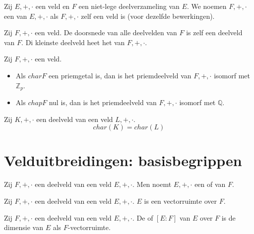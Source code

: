 \documentclass[main.tex]{subfiles}
\begin{document}
\begin{de}
  Zij $E,+,\cdot$ een veld en $F$ een niet-lege deelverzameling van $E$.
  We noemen $F,+,\cdot$ een  van $E,+,\cdot$ als $F,+,\cdot$ zelf een veld is (voor dezelfde bewerkingen).
\end{de}


\begin{de}
  Zij $F,+,\cdot$ een veld.
  De doorsnede van alle deelvelden van $F$ is zelf een deelveld van $F$.
  Di kleinste deelveld heet het  van $F,+,\cdot$.
\end{de}

\begin{st}
  Zij $F,+,\cdot$ een veld.
  \begin{itemize}
  \item Als $char{F}$ een priemgetal is, dan is het priemdeelveld van $F,+,\cdot$ isomorf met $\mathbb{Z}_{p}$.
  \item Als $chap{F}$ nul is, dan is het priemdeelveld van $F,+,\cdot$ isomorf met $\mathbb{Q}$.
  \end{itemize}
\end{st}

\begin{st}
  Zij $K,+,\cdot$ een deelveld van een veld $L,+,\cdot$.
  \[ char(K) = char(L) \]
\end{st}

\section{Velduitbreidingen: basisbegrippen}
\label{sec:veld-basisb}

\begin{de}
  Zij $F,+,\cdot$ een deelveld van een veld $E,+,\cdot$.
  Men noemt $E,+,\cdot$ een  of  van $F$.
\end{de}

\begin{de}
  Zij $F,+,\cdot$ een deelveld van een veld $E,+,\cdot$.
  $E$ is een vectorruimte over $F$.
\end{de}

\begin{de}
  Zij $F,+,\cdot$ een deelveld van een veld $E,+,\cdot$.
  De  of  $[E:F]$ van $E$ over $F$ is de dimensie van $E$ als $F$-vectorruimte.
\end{de}
\end{document}

